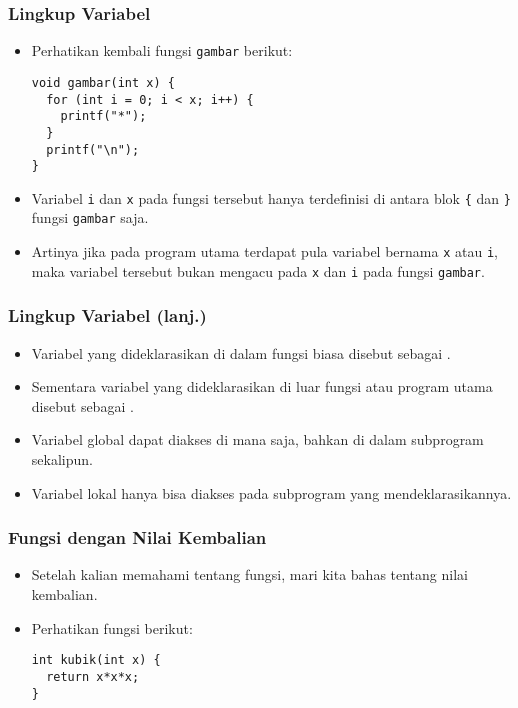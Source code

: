 \begin{frame}[fragile]
\frametitle{Lingkup Variabel}
\begin{itemize}
  \item Perhatikan kembali fungsi \texttt{gambar} berikut:
\begin{lstlisting}
void gambar(int x) {
  for (int i = 0; i < x; i++) {
    printf("*");
  }
  printf("\n");
}

\end{lstlisting}
  \item Variabel \texttt{i} dan \texttt{x} pada fungsi tersebut hanya terdefinisi di antara blok \texttt{\{} dan \texttt{\}} fungsi \texttt{gambar} saja.
  \item Artinya jika pada program utama terdapat pula variabel bernama \texttt{x} atau \texttt{i}, maka variabel tersebut \alert{bukan} mengacu pada \texttt{x} dan \texttt{i} pada fungsi \texttt{gambar}.
\end{itemize}
\end{frame}

\begin{frame}[fragile]
\frametitle{Lingkup Variabel (lanj.)}
\begin{itemize}
  \item Variabel yang dideklarasikan di dalam fungsi biasa disebut sebagai .
  \item Sementara variabel yang dideklarasikan di luar fungsi atau program utama disebut sebagai .
  \item Variabel global dapat diakses di mana saja, bahkan di dalam subprogram sekalipun.
  \item Variabel lokal hanya bisa diakses pada subprogram yang mendeklarasikannya.
\end{itemize}
\end{frame}

\begin{frame}[fragile]
\frametitle{Fungsi dengan Nilai Kembalian}
\begin{itemize}
  \item Setelah kalian memahami tentang fungsi, mari kita bahas tentang nilai kembalian.
  \item Perhatikan fungsi berikut:
\begin{lstlisting}
int kubik(int x) {
  return x*x*x;
}
\end{lstlisting}
\end{itemize}
\end{frame}

